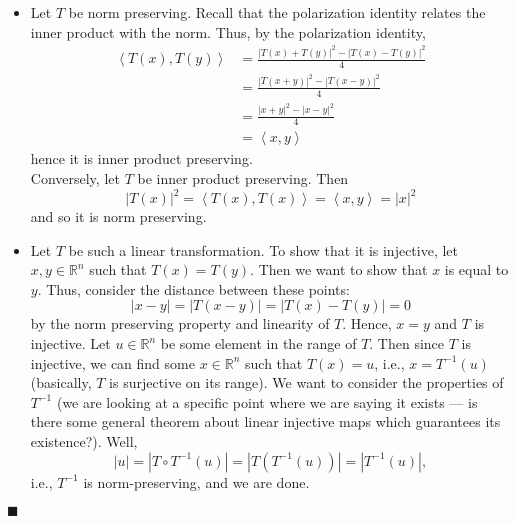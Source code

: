 \documentclass[12pt]{article}
\renewcommand{\qed}{\hfill$\blacksquare$}
\renewenvironment{proof}{\begin{addmargin}[1em]{0em}\begin{newproof}}{\end{newproof}\end{addmargin}\qed}
\begin{document}
\begin{proof}
\begin{itemize}
	\item Let $T$ be norm preserving. Recall that the polarization identity relates the inner product with the norm. Thus, by the polarization identity,
	\begin{equation*}
	\begin{split}
	\left\langle T\left(x\right), T\left(y\right) \right\rangle & = \frac{\left|T\left(x\right) + T\left(y\right) \right|^2 - \left|T\left(x\right)-T\left(y\right)\right|^2 }{4} \\
	& = \frac{\left| T\left(x+y\right)\right|^2 - \left| T\left(x-y\right)\right|^2}{4} \\
	& = \frac{\left| x+y\right|^2 - \left|x-y\right|^2}{4}  \\
	& = \left\langle x,y\right\rangle 
	\end{split} 
	\end{equation*}
	hence it is inner product preserving. \\
	Conversely, let $T$ be inner product preserving. Then
	$$ \left|T\left(x\right)\right|^2 = \left\langle T\left(x\right), T\left(x\right) \right\rangle = \left\langle x, y\right\rangle = \left|x\right|^2 $$ and so it is norm preserving. \\
	\item Let $T$ be such a linear transformation. To show that it is injective, let $x,y\in \mathbb{R}^n$ such that $T\left(x\right) = T\left(y\right)$. Then we want to show that $x$ is equal to $y$. Thus, consider the distance between these points:
	$$ \left|x-y\right| = \left| T\left(x-y\right) \right| = \left|T\left(x\right) - T\left(y\right) \right| = 0$$
	by the norm preserving property and linearity of $T$. Hence, $x=y$ and $T$ is injective. Let $u\in \mathbb{R}^n$ be some element in the range of $T$. Then since $T$ is injective, we can find some $x\in\mathbb{R}^n$ such that $T\left(x\right) = u$, i.e., $x = T^{-1}\left(u\right)$ (basically, $T$ is surjective on its range). We want to consider the properties of $T^{-1}$ (we are looking at a specific point where we are saying it exists --- is there some general theorem about linear injective maps which guarantees its existence?). Well,
	$$ \left| u \right| = \left| T \circ T^{-1} \left(u\right) \right| = \left| T \left(T^{-1}\left(u\right)\right) \right| = \left| T^{-1}\left(u\right) \right|, $$ i.e., $T^{-1}$ is norm-preserving, and we are done.
\end{itemize}
\end{proof}
\end{document}
